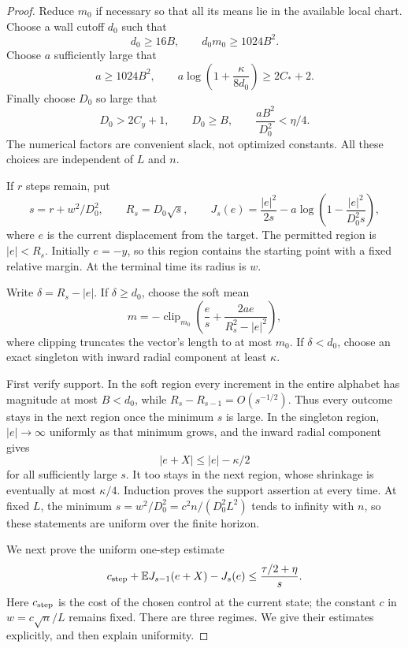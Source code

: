 \documentclass[11pt]{article}
\numberwithin{equation}{section}
\theoremstyle{definition}
\theoremstyle{remark}
\begin{document}
\begin{proof}
Reduce \(m_0\) if necessary so that all its means lie in the available
local chart.  Choose a wall cutoff \(d_0\) such that
\[
 d_0\geq16B,
 \qquad d_0m_0\geq1024B^2.
\]
Choose \(a\) sufficiently large that
\[
 a\geq1024B^2,
 \qquad
 a\log\left(1+\frac{\kappa}{8d_0}\right)\geq2C_*+2.
\]
Finally choose \(D_0\) so large that
\begin{equation}\label{ap:constants}
 D_0>2C_y+1,
 \qquad D_0\geq B,
 \qquad \frac{aB^2}{D_0^2}<\eta/4.
\end{equation}
The numerical factors are convenient slack, not optimized constants.
All these choices are independent of \(L\) and \(n\).

If \(r\) steps remain, put
\[
 s=r+w^2/D_0^2,
 \qquad R_s=D_0\sqrt s,
 \qquad
 J_s(e)=\frac{|e|^2}{2s}
       -a\log\left(1-\frac{|e|^2}{D_0^2s}\right),
\]
where \(e\) is the current displacement from the target.  The permitted
region is \(|e|<R_s\).  Initially \(e=-y\), so this region contains
the starting point with a fixed relative margin.  At the terminal time
its radius is \(w\).

Write \(\delta=R_s-|e|\).  If \(\delta\geq d_0\), choose the soft
mean
\begin{equation}\label{ap:feedback}
 m=-\operatorname{clip}_{m_0}
   \left(\frac e s+\frac{2ae}{R_s^2-|e|^2}\right),
\end{equation}
where clipping truncates the vector's length to at most \(m_0\).
If \(\delta<d_0\), choose an exact singleton with inward radial
component at least \(\kappa\).

First verify support.  In the soft region every increment in the entire
alphabet has magnitude at most \(B<d_0\), while
\(R_s-R_{s-1}=O(s^{-1/2})\).  Thus every outcome stays in the next
region once the minimum \(s\) is large.  In the singleton region,
\(|e|\to\infty\) uniformly as that minimum grows, and the inward
radial component gives
\[
 |e+X|\leq |e|-\kappa/2
\]
for all sufficiently large \(s\).  It too stays in the next region,
whose shrinkage is eventually at most \(\kappa/4\).  Induction proves
the support assertion at every time.  At fixed \(L\), the minimum
\(s=w^2/D_0^2=c^2n/(D_0^2L^2)\) tends to infinity with \(n\), so
these statements are uniform over the finite horizon.

We next prove the uniform one-step estimate
\begin{equation}\label{ap:one-step}
 c_{\rm step}+\mathbb E J_{s-1}(e+X)-J_s(e)
 \leq\frac{\tau/2+\eta}{s}.
\end{equation}
Here \(c_{\rm step}\) is the cost of the chosen control at the
current state; the constant \(c\) in \(w=c\sqrt n/L\) remains fixed.
There are three regimes.  We give their estimates explicitly, and then
explain uniformity.


\end{proof}
\end{document}

